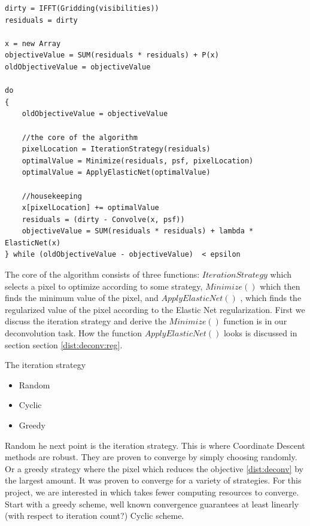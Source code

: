 \begin{lstlisting}
dirty = IFFT(Gridding(visibilities))
residuals = dirty

x = new Array
objectiveValue = SUM(residuals * residuals) + P(x)
oldObjectiveValue = objectiveValue

do 
{
	oldObjectiveValue = objectiveValue

	//the core of the algorithm
	pixelLocation = IterationStrategy(residuals)
	optimalValue = Minimize(residuals, psf, pixelLocation)
	optimalValue = ApplyElasticNet(optimalValue)
	
	//housekeeping
	x[pixelLocation] += optimalValue
	residuals = (dirty - Convolve(x, psf))
	objectiveValue = SUM(residuals * residuals) + lambda * ElasticNet(x)
} while (oldObjectiveValue - objectiveValue)  < epsilon
\end{lstlisting}

The core of the algorithm consists of three functions: $IterationStrategy$ which selects a pixel to optimize according to some strategy, $Minimize()$ which then finds the minimum value of the pixel, and $ApplyElasticNet()$ , which finds the regularized value of the pixel according to the Elastic Net regularization. First we discuss the iteration strategy and derive the  $Minimize()$ function is in our deconvolution task. How the function $ApplyElasticNet()$ looks is discussed in section section \ref{dist:deconv:reg}.

The iteration strategy
\begin{itemize}
	\item Random
	\item Cyclic
	\item Greedy
\end{itemize}
Random 
he next point is the iteration strategy. This is where Coordinate Descent methods are robust. They are proven to converge by simply choosing randomly. Or a greedy strategy where the pixel which reduces the objective \eqref{dist:deconv} by the largest amount. It was proven to converge for a variety of strategies. For this project, we are interested in which takes fewer computing resources to converge. 
Start with a greedy scheme, well known convergence guarantees at least linearly (with respect to iteration count?)\cite{luo1992convergence}
Cyclic scheme.

